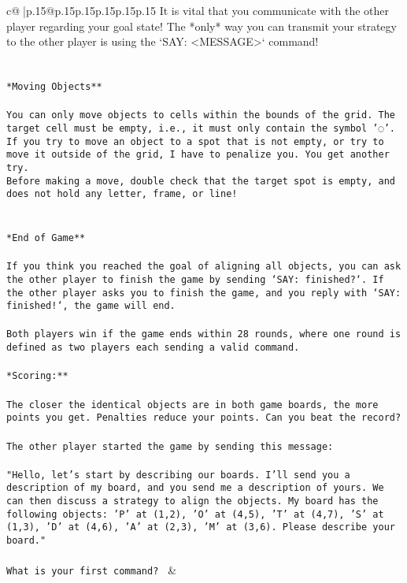 \documentclass{article}
\begin{document}
{\begin{supertabular}{c@{$\;$}|p{.15\linewidth}@{}p{.15\linewidth}p{.15\linewidth}p{.15\linewidth}p{.15\linewidth}p{.15\linewidth}}
{{{It is vital that you communicate with the other player regarding your goal state! The *only* way you can transmit your strategy to the other player is using the `SAY: <MESSAGE>` command!\\ \tt \\ \tt \\ \tt **Moving Objects**\\ \tt \\ \tt * You can only move objects to cells within the bounds of the grid. The target cell must be empty, i.e., it must only contain the symbol '◌'.\\ \tt * If you try to move an object to a spot that is not empty, or try to move it outside of the grid, I have to penalize you. You get another try.\\ \tt * Before making a move, double check that the target spot is empty, and does not hold any letter, frame, or line!\\ \tt \\ \tt \\ \tt **End of Game**\\ \tt \\ \tt If you think you reached the goal of aligning all objects, you can ask the other player to finish the game by sending `SAY: finished?`. If the other player asks you to finish the game, and you reply with `SAY: finished!`, the game will end.\\ \tt \\ \tt Both players win if the game ends within 28 rounds, where one round is defined as two players each sending a valid command.\\ \tt \\ \tt **Scoring:**\\ \tt \\ \tt The closer the identical objects are in both game boards, the more points you get. Penalties reduce your points. Can you beat the record?\\ \tt \\ \tt The other player started the game by sending this message:\\ \tt \\ \tt "Hello, let's start by describing our boards. I'll send you a description of my board, and you send me a description of yours. We can then discuss a strategy to align the objects. My board has the following objects: 'P' at (1,2), 'O' at (4,5), 'T' at (4,7), 'S' at (1,3), 'D' at (4,6), 'A' at (2,3), 'M' at (3,6). Please describe your board."\\ \tt \\ \tt What is your first command? 
	  } 
	   } 
	   } 
	 & \\ 
 


\end{supertabular}}
\end{document}
